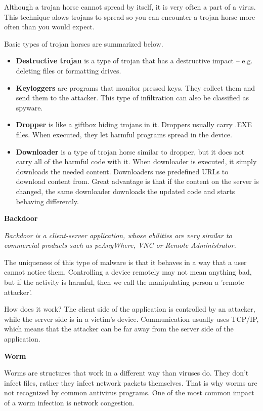 \documentclass[review]{elsarticle}
\begin{document}
Although a trojan horse cannot spread by itself, it is very often a part of a virus. This technique alows trojans to spread so you can encounter a trojan horse more often than you would expect. \cite{viryHak}

Basic types of trojan horses are summarized below.
\begin{itemize}
\item \textbf{Destructive trojan} is a type of trojan that has a destructive impact -- e.g. deleting files or formatting drives.

\item \textbf{Keyloggers} are programs that monitor pressed keys. They collect them and send them to the attacker. This type of infiltration can also be classified as spyware.

\item \textbf{Dropper} is like a giftbox hiding trojans in it. Droppers usually carry .EXE files. When executed, they let harmful programs spread in the device.

\item \textbf{Downloader} is a type of trojan horse similar to dropper, but it does not carry all of the harmful code with it. When downloader is executed, it simply downloads the needed content. Downloaders use predefined URLs to download content from. Great advantage is that if the content on the server is changed, the same downloader downloads the updated code and starts behaving differently.
\end{itemize}

\textbf{Backdoor}

\textit{Backdoor is a client-server application, whose abilities are very similar to commercial products such as pcAnyWhere, VNC or Remote Administrator.} \cite{viryHak}

The uniqueness of this type of malware is that it behaves in a way that a user cannot notice them. Controlling a device remotely may not mean anything bad, but if the activity is harmful, then we call the manipulating person a 'remote attacker'. \cite{viryHak} 

How does it work? The client side of the application is controlled by an attacker, while the server side is in a victim's device. Communication usually uses TCP/IP, which means that the attacker can be far away from the server side of the application. \cite{viryHak}

\textbf{Worm}

Worms are structures that work in a different way than viruses do. They don't infect files, rather they infect network packets themselves. That is why worms are not recognized by common antivirus programs. One of the most common impact of a worm infection is network congestion.
\end{document}
